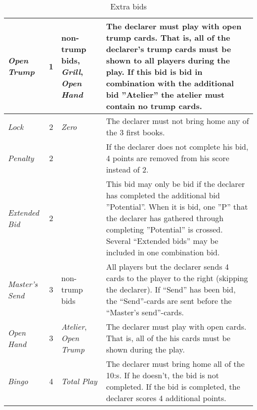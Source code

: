 \begin{table}
\begin{center}
{\begin{tabularx}{\textwidth}{ lcX | p{6cm} }
					\textit{Open Trump} & 1 &
					non-trump bids, \newline \textit{Grill}, \newline \textit{Open Hand} &
					The declarer must play with open trump cards. That is, all of the declarer’s trump cards must be shown to all players during the play. If this bid is bid in combination with the additional bid ”Atelier” the atelier must contain no trump cards.
					\\ \hline
					
					\textit{Lock} & 2 &
					\textit{Zero} &
					The declarer must not bring home any of the 3 first books.
					\\ \hline
					
					\textit{Penalty} & 2 &
					&
					If the declarer does not complete his bid, 4 points are removed from his score instead of 2.
					\\ \hline
					
					\textit{Extended Bid} & 2 &
					&
					This bid may only be bid if the declarer has completed the additional bid ”Potential”. When it is bid, one ”P” that the declarer has gathered through completing ”Potential” is crossed. Several ``Extended bids'' may be included in one combination bid.
					\\ \hline
					
					\textit{Master's Send} & 3 &
					non-trump bids &
					All players but the declarer sends 4 cards to the player to the right (skipping the declarer). If ``Send'' has been bid, the ``Send''-cards are sent before the ``Master's send''-cards.
					\\ \hline
					
					\textit{Open Hand} & 3 &
					
 
					\textit{Atelier}, \newline \textit{Open Trump} &
					The declarer must play with open cards. That is, all of the his cards must be shown during the play.
					\\ \hline
					
					\textit{Bingo} & 4 &
					\textit{Total Play} &
					The declarer must bring home all of the 10:s. If he doesn't, the bid is not completed. If the bid is completed, the declarer scores 4 additional points.
			\end{tabularx}
		}
	\end{center}
	\caption{Extra bids}
	\label{tab:extraBids}
\end{table}
